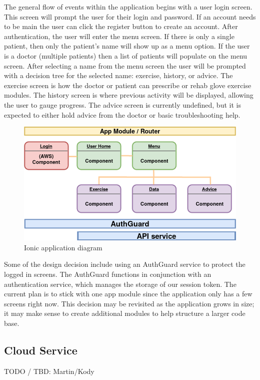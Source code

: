 \documentclass[a4paper,10pt]{article}
\begin{document}
            The general flow of events within the application begins with a user login screen. This screen will prompt the user for their login and password. If an account needs to be main the user can click the register button to create an account. After authentication, the user will enter the menu screen. If there is only a single patient, then only the patient's name will show up as a menu option. If the user is a doctor (multiple patients) then a list of patients will populate on the menu screen. After selecting a name from the menu screen the user will be prompted with a decision tree for the selected name: exercise, history, or advice. The exercise screen is how the doctor or patient can prescribe or rehab glove exercise modules. The history screen is where previous activity will be displayed, allowing the user to gauge progress. The advice screen is currently undefined, but it is expected to either hold advice from the doctor or basic troubleshooting help.
            \begin{figure}[h]
            \centering
            \includegraphics[width=140mm, scale=1]{ionicAppLayout}
            \caption{Ionic application diagram}
            \end{figure}
            
            Some of the design decision include using an AuthGuard service to protect the logged in screens. The AuthGuard functions in conjunction with an authentication service, which manages the storage of our session token. The current plan is to stick with one app module since the application only has a few screens right now. This decision may be revisited as the application grows in size; it may make sense to create additional modules to help structure a larger code base. 
            
        \subsection{Cloud Service}
            TODO / TBD: Martin/Kody
            
\end{document}
